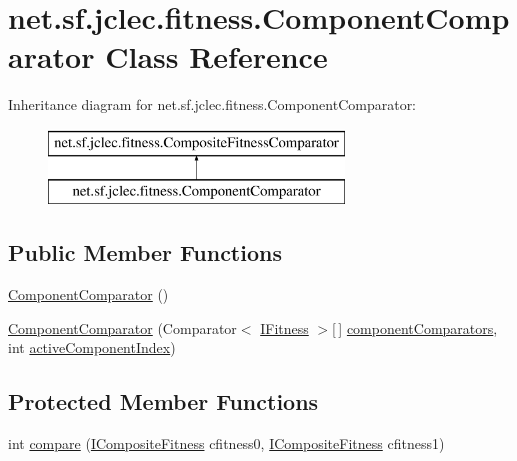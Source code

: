 \hypertarget{classnet_1_1sf_1_1jclec_1_1fitness_1_1_component_comparator}{\section{net.\-sf.\-jclec.\-fitness.\-Component\-Comparator Class Reference}
\label{classnet_1_1sf_1_1jclec_1_1fitness_1_1_component_comparator}
}
Inheritance diagram for net.\-sf.\-jclec.\-fitness.\-Component\-Comparator\-:\begin{figure}[H]
\begin{center}
\leavevmode
\includegraphics[height=2.000000cm]{classnet_1_1sf_1_1jclec_1_1fitness_1_1_component_comparator}
\end{center}
\end{figure}
\subsection*{Public Member Functions}
\begin{DoxyCompactItemize}
\item 
\hyperlink{classnet_1_1sf_1_1jclec_1_1fitness_1_1_component_comparator_a24bb0f31b4483a5402ab320e557f0949}{Component\-Comparator} ()
\item 
\hyperlink{classnet_1_1sf_1_1jclec_1_1fitness_1_1_component_comparator_a7f48852ccca7d46ce368fbd3f6803c5f}{Component\-Comparator} (Comparator$<$ \hyperlink{interfacenet_1_1sf_1_1jclec_1_1_i_fitness}{I\-Fitness} $>$\mbox{[}$\,$\mbox{]} \hyperlink{classnet_1_1sf_1_1jclec_1_1fitness_1_1_composite_fitness_comparator_a8448c857b752923973aba83432b52253}{component\-Comparators}, int \hyperlink{classnet_1_1sf_1_1jclec_1_1fitness_1_1_component_comparator_a7b4fea26c0f1dffe0b952992127bc4d7}{active\-Component\-Index})
\end{DoxyCompactItemize}
\subsection*{Protected Member Functions}
\begin{DoxyCompactItemize}
\item 
int \hyperlink{classnet_1_1sf_1_1jclec_1_1fitness_1_1_component_comparator_a0efa44541933fc99b581b7cd5f17aa3f}{compare} (\hyperlink{interfacenet_1_1sf_1_1jclec_1_1fitness_1_1_i_composite_fitness}{I\-Composite\-Fitness} cfitness0, \hyperlink{interfacenet_1_1sf_1_1jclec_1_1fitness_1_1_i_composite_fitness}{I\-Composite\-Fitness} cfitness1)
\end{DoxyCompactItemize}
